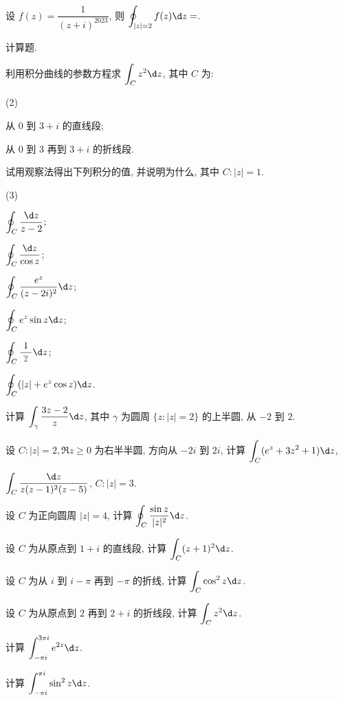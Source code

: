 \begin{homework}
\begin{subex}
    \item 设 $f(z)=\dfrac1{(z+i)^{2023}}$, 则 $\displaystyle\oint_{|z|=2}f(z)\d z=$\fillblank{}.
  \end{subex}
  \item 计算题.
  \begin{subex}
    \item 利用积分曲线的参数方程求 $\displaystyle\int_C z^2\d z$, 其中 $C$ 为:
      \begin{subsubex}(2)
        \item 从 $0$ 到 $3+i$ 的直线段;
        \item 从 $0$ 到 $3$ 再到 $3+i$ 的折线段.
      \end{subsubex}
    \item 试用观察法得出下列积分的值, 并说明为什么, 其中 $C:|z|=1$.
      \begin{subsubex}(3)
        \item $\displaystyle\oint_C\frac{\d z}{z-2}$;
        \item $\displaystyle\oint_C\frac{\d z}{\cos z}$;
        \item $\displaystyle\oint_C\frac{e^z}{(z-2i)^2}\d z$;
        \item $\displaystyle\oint_Ce^z\sin z\d z$;
        \item $\displaystyle\oint_C\dfrac{\ 1\ }{\ov z}\d z$;
        \item $\displaystyle\oint_C(|z|+e^z\cos z)\d z$.
      \end{subsubex}
    \item 计算 $\displaystyle\int_\gamma\dfrac{3z-2}{z}\d z$, 其中 $\gamma$ 为圆周 $\{z: |z|=2\}$ 的上半圆, 从 $-2$ 到 $2$.
    \item 设 $C:|z|=2,\Re z\ge 0$ 为右半半圆, 方向从 $-2i$ 到 $2i$, 计算 $\displaystyle\int_C(e^z+3z^2+1)\d z$,
    \item $\displaystyle\int_C\dfrac{\d z}{z(z-1)^2(z-5)}$, $C:|z|=3$.
    \item 设 $C$ 为正向圆周 $|z|=4$, 计算 $\displaystyle\oint_C\dfrac{\sin z}{|z|^2}\d z$.
    \item 设 $C$ 为从原点到 $1+i$ 的直线段, 计算 $\displaystyle\int_C(z+1)^2\d z$.
    \item 设 $C$ 为从 $i$ 到 $i-\pi$ 再到 $-\pi$ 的折线, 计算 $\displaystyle\int_C\cos^2z\d z$.
    \item 设 $C$ 为从原点到 $2$ 再到 $2+i$ 的折线段, 计算 $\displaystyle\int_Cz^2\d z$.
    \item 计算 $\displaystyle\int_{-\pi i}^{3\pi i}e^{2z}\d z$.
    \item 计算 $\displaystyle\int_{-\pi i}^{\pi i}\sin^2z\d z$.

\end{subex}
\end{homework}
